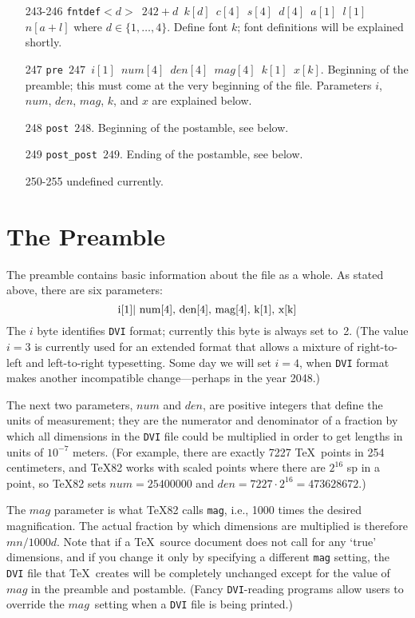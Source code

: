 \documentclass{article}
\begin{document}
\begin{itemize}
\item[243-246] \texttt{fntdef$<d>$ $242+d$ 
$k[d]$ $c[4]$ $s[4]$ $d[4]$ $a[1]$ $l[1]$ $n[a+l]$} 
where $d\in\{1,\dots,4\}$. 
Define font $k$; font definitions will be explained shortly.

\item[247] \texttt{pre $247$ $i[1]$ $num[4]$ $den[4]$ $mag[4]$ $k[1]$ $x[k]$}.
Beginning of the preamble; 
this must come at the very beginning of the file. 
Parameters $i$, $num$, $den$, $mag$, $k$, and $x$ are explained below.

\item[248] \texttt{post $248$}. 
Beginning of the postamble, see below. 

\item[249] \texttt{post\_post $249$}. 
Ending of the postamble, see below. 

\item[250-255] undefined currently. 
\end{itemize}

\section{The Preamble}
\label{sec:preamble}

The preamble contains basic information about the file as a whole. 
As stated above, there are six parameters:
$$\hbox{i[1]| num[4], den[4], mag[4], k[1], x[k]}$$
The $i$ byte identifies \texttt{DVI} format; 
currently this byte is always set to~2. 
(The value $i=3$ is currently used for an extended format that
allows a mixture of right-to-left and left-to-right typesetting.
Some day we will set $i=4$, when \texttt{DVI} format makes another
incompatible change---perhaps in the year 2048.)

The next two parameters, $num$ and $den$, are positive integers that define
the units of measurement; they are the numerator and denominator of a
fraction by which all dimensions in the \texttt{DVI} file could be multiplied
in order to get lengths in units of $10^{-7}$ meters. (For example, there are
exactly 7227 \TeX\ points in 254 centimeters, and \TeX82 works with scaled
points where there are $2^{16}$ sp in a point, so \TeX82 sets $num=25400000$
and $den=7227\cdot2^{16}=473628672$.)


The $mag$ parameter is what \TeX82 calls \texttt{mag}, i.e., 1000 times the
desired magnification. The actual fraction by which dimensions are
multiplied is therefore $mn/1000d$. Note that if a \TeX\ source document
does not call for any `{true}' dimensions, and if you change it only by
specifying a different \texttt{mag} setting, the \texttt{DVI} file that \TeX\
creates will be completely unchanged except for the value of $mag$ in the
preamble and postamble. (Fancy \texttt{DVI}-reading programs allow users to
override the $mag$~setting when a \texttt{DVI} file is being printed.)
\end{document}

